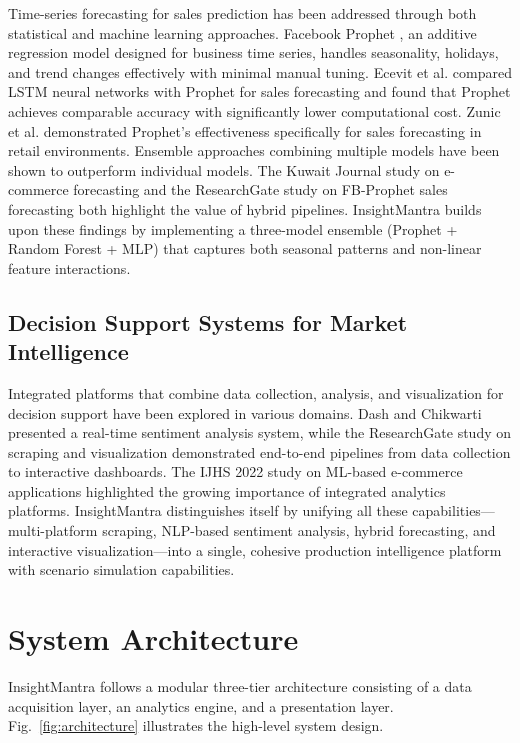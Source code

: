 \documentclass[conference]{IEEEtran}
\begin{document}
Time-series forecasting for sales prediction has been addressed through both statistical and machine learning approaches. Facebook Prophet \cite{b9}, an additive regression model designed for business time series, handles seasonality, holidays, and trend changes effectively with minimal manual tuning. Ecevit et al. \cite{b10} compared LSTM neural networks with Prophet for sales forecasting and found that Prophet achieves comparable accuracy with significantly lower computational cost. Zunic et al. \cite{b11} demonstrated Prophet's effectiveness specifically for sales forecasting in retail environments. Ensemble approaches combining multiple models have been shown to outperform individual models. The Kuwait Journal study on e-commerce forecasting \cite{b12} and the ResearchGate study on FB-Prophet sales forecasting \cite{b13} both highlight the value of hybrid pipelines. InsightMantra builds upon these findings by implementing a three-model ensemble (Prophet + Random Forest + MLP) that captures both seasonal patterns and non-linear feature interactions.

\subsection{Decision Support Systems for Market Intelligence}

Integrated platforms that combine data collection, analysis, and visualization for decision support have been explored in various domains. Dash and Chikwarti \cite{b14} presented a real-time sentiment analysis system, while the ResearchGate study on scraping and visualization \cite{b15} demonstrated end-to-end pipelines from data collection to interactive dashboards. The IJHS 2022 study \cite{b16} on ML-based e-commerce applications highlighted the growing importance of integrated analytics platforms. InsightMantra distinguishes itself by unifying all these capabilities---multi-platform scraping, NLP-based sentiment analysis, hybrid forecasting, and interactive visualization---into a single, cohesive production intelligence platform with scenario simulation capabilities.

\section{System Architecture}

InsightMantra follows a modular three-tier architecture consisting of a data acquisition layer, an analytics engine, and a presentation layer. Fig.~\ref{fig:architecture} illustrates the high-level system design.
\end{document}
